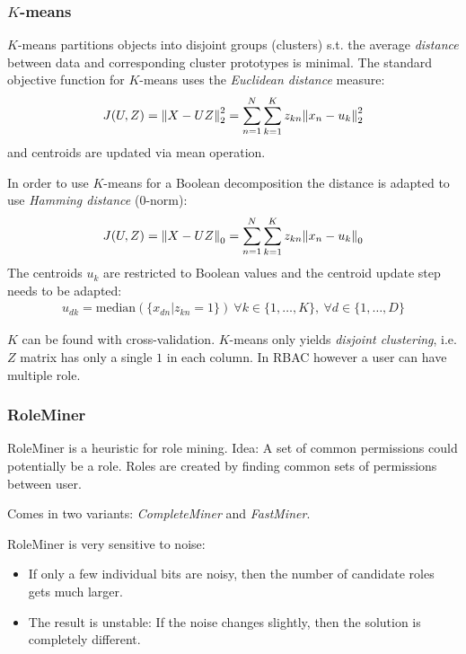 \subsubsection{$K$-means}
$K$-means partitions objects into disjoint groups (clusters) s.t. the average \emph{distance} between data and corresponding cluster prototypes is minimal. 
The standard objective function for $K$-means uses the \emph{Euclidean distance} measure:
\begin{align*}
    J(U,Z) = \norm{X-UZ}_2^2 = \sum_{n=1}^N \sum_{k=1}^K z_{kn} \norm{x_n - u_k}_2^2
\end{align*}
and centroids are updated via mean operation.

In order to use $K$-means for a Boolean decomposition the distance is adapted to use \emph{Hamming distance} (0-norm):
\begin{align*}
    J(U,Z) = \norm{X-UZ}_0 = \sum_{n=1}^N \sum_{k=1}^K z_{kn} \norm{x_n - u_k}_0
\end{align*}
The centroids $u_k$ are restricted to Boolean values and the centroid update step needs to be adapted:
\begin{align*}
    u_{dk} = \text{median}(\{x_{dn}|z_{kn} =1 \})\ \forall k\in \{1,\ldots,K\},\ \forall d \in \{1,\ldots, D\}
\end{align*}

$K$ can be found with cross-validation. $K$-means only yields \emph{disjoint clustering}, i.e. $Z$ matrix has only a single $1$ in each column. In RBAC however a user can have multiple role. 

\subsubsection{RoleMiner}
RoleMiner is a heuristic for role mining. Idea: A set of common permissions could potentially be a role. Roles are created by finding common sets of permissions between user.

Comes in two variants: \emph{CompleteMiner} and \emph{FastMiner}.

RoleMiner is very sensitive to noise:
\begin{itemize}
    \item If only a few individual bits are noisy, then the number of candidate roles gets much larger.
    \item The result is unstable: If the noise changes slightly, then the solution is completely different.
\end{itemize}


